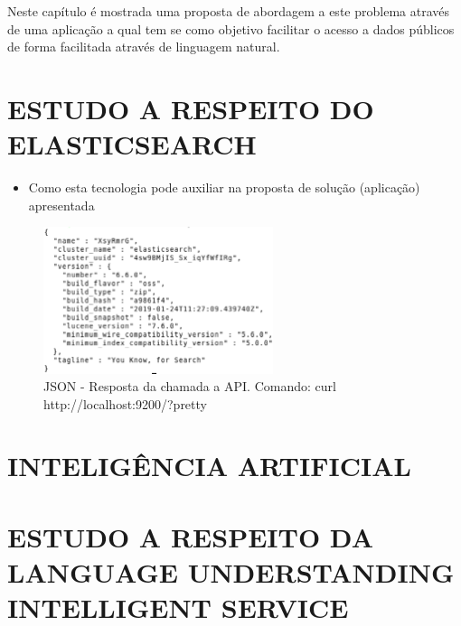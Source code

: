 Neste capítulo é mostrada uma proposta de abordagem a este problema através de uma aplicação a qual tem se como objetivo facilitar o acesso a dados públicos de forma facilitada através de linguagem natural.

\section{\uppercase{Estudo a respeito do Elasticsearch}}


\begin{itemize}
	\item Como esta tecnologia pode auxiliar na proposta de solução (aplicação) apresentada
\end{itemize}
\begin{figure}[!htb]
	\caption{\label{fig_grafico}JSON - Resposta da chamada a API. Comando: curl http://localhost:9200/?pretty}
	\begin{center}
		\includegraphics[width=0.6\textwidth]{imagens/pretty.eps}
	\end{center}
\end{figure}

\section{\uppercase{Inteligência Artificial}}


\section{\uppercase{Estudo a respeito da Language Understanding Intelligent Service}}



